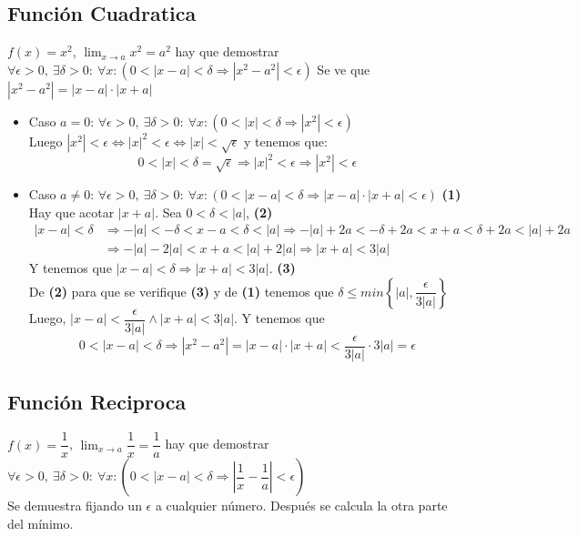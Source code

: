 \documentclass[11pt,a4paper]{article}
\begin{document}
\subsection{Funci\'on Cuadratica}
$f(x)=x^2$, $\displaystyle{\lim_{x\to a}x^2=a^2}$ hay que demostrar $\forall\epsilon>0,\ \exists\delta>0:\ \forall x: (0<|x-a|<\delta \Rightarrow |x^2-a^2|<\epsilon)$
Se ve que $|x^2-a^2| = |x-a|\cdot|x+a|$
\begin{itemize}
\item Caso $a=0$: $\forall\epsilon>0,\ \exists\delta>0:\ \forall x: (0<|x|<\delta \Rightarrow |x^2|<\epsilon)$\\
Luego $|x^2|<\epsilon \iff |x|^2<\epsilon \iff |x|<\sqrt{\epsilon}$ y tenemos que: $$0<|x|<\delta=\sqrt{\epsilon} \Rightarrow |x|^2<\epsilon \Rightarrow |x^2|<\epsilon$$
\item Caso $a\not = 0$: $\forall\epsilon>0,\ \exists\delta>0:\ \forall x: (0<|x-a|<\delta \Rightarrow |x-a|\cdot|x+a|<\epsilon)$ \hfill \textbf{(1)}\\
Hay que acotar $|x+a|$. Sea $0<\delta<|a|$, \hfill \textbf{(2)}
\begin{align*}
|x-a|<\delta &\Rightarrow -|a|<-\delta<x-a<\delta<|a| \Rightarrow -|a|+2a<-\delta+2a < x+a < \delta+2a < |a|+2a\\
& \Rightarrow -|a|-2|a| < x+a < |a|+2|a| \Rightarrow |x+a| < 3|a|
\end{align*}
Y tenemos que $|x-a|<\delta \Rightarrow |x+a| < 3|a|$. \hfill \textbf{(3)}\\
De \textbf{(2)} para que se verifique \textbf{(3)} y de \textbf{(1)} tenemos que $\delta\leq min\left\{|a|, \dfrac{\epsilon}{3|a|}\right\}$\\
Luego, $|x-a|<\dfrac{\epsilon}{3|a|} \land |x+a|<3|a|$. Y tenemos que $$0<|x-a|<\delta \Rightarrow |x^2-a^2| = |x-a|\cdot|x+a| < \dfrac{\epsilon}{3|a|}\cdot 3|a| = \epsilon$$
\end{itemize}

\subsection{Funci\'on Reciproca}
$f(x)=\dfrac{1}{x}$, $\displaystyle{\lim_{x\to a}\dfrac{1}{x}=\dfrac{1}{a}}$ hay que demostrar $\forall\epsilon>0,\ \exists\delta>0:\ \forall x: (0<|x-a|<\delta \Rightarrow |\dfrac{1}{x}-\dfrac{1}{a}|<\epsilon)$\\

\indent Se demuestra fijando un $\epsilon$ a cualquier n\'umero. Despu\'es se calcula la otra parte del m\'inimo.
\end{document}
